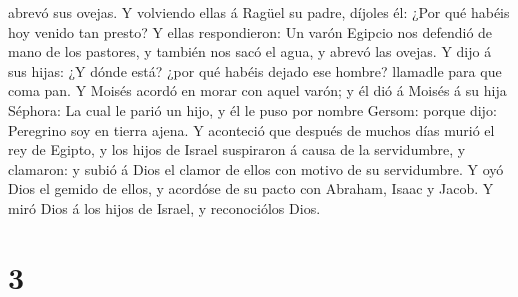 abrevó sus ovejas.  Y volviendo ellas á Ragüel su padre,
díjoles él: ¿Por qué habéis hoy venido tan presto?  Y
ellas respondieron: Un varón Egipcio nos defendió de mano de los
pastores, y también nos sacó el agua, y abrevó las ovejas.
 Y dijo á sus hijas: ¿Y dónde está? ¿por qué habéis
dejado ese hombre? llamadle para que coma pan.  Y Moisés
acordó en morar con aquel varón; y él dió á Moisés á su hija Séphora:
 La cual le parió un hijo, y él le puso por nombre
Gersom: porque dijo: Peregrino soy en tierra ajena.  Y
aconteció que después de muchos días murió el rey de Egipto, y los hijos
de Israel suspiraron á causa de la servidumbre, y clamaron: y subió á
Dios el clamor de ellos con motivo de su servidumbre.  Y
oyó Dios el gemido de ellos, y acordóse de su pacto con Abraham, Isaac y
Jacob.  Y miró Dios á los hijos de Israel, y reconociólos
Dios.

\hypertarget{section-2}{%
\section{3}\label{section-2}}

